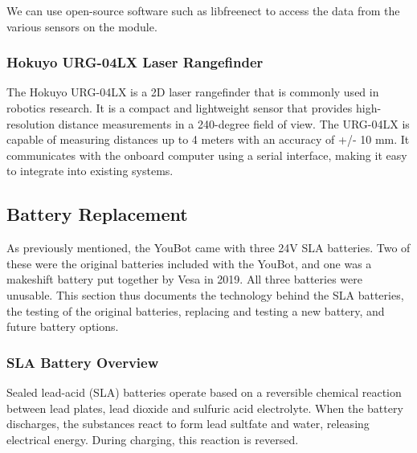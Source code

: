 \documentclass[a4paper, 12pt]{article}
\newif\ifshownotes
\newcommand{\notes}[1]{\ifshownotes\textcolor{blue}{#1}\fi}
\begin{document}
    We can use open-source software such as libfreenect to access the data from the various sensors on the module.


    \notes{discuss the libfreenect library, how to install it, and how it could be used within ROS.}


    \subsubsection{Hokuyo URG-04LX Laser Rangefinder}

    The Hokuyo URG-04LX is a 2D laser rangefinder that is commonly used in robotics research. It is a compact and lightweight sensor that provides high-resolution distance measurements in a 240-degree field of view. The URG-04LX is capable of measuring distances up to 4 meters with an accuracy of +/- 10 mm. It communicates with the onboard computer using a serial interface, making it easy to integrate into existing systems.

    \notes{discuss installing the drivers and whatnot, and how to use it within ROS and rqt.}

   
    \pagebreak

    \subsection{Battery Replacement}



    \notes{draft 1, 11.05 12pm\\
    Here are some good web pages about the Slealed Lead Acid (SLA) batteries:
https://batterymasters.co.uk/blog/post/How%
and
https://www.power-sonic.com/blog/how-to-charge-a-lead-acid-battery/
and
https://www.powerstream.com/SLA.htm}

    As previously mentioned, the YouBot came with three 24V SLA batteries. Two of these were the original batteries included with the YouBot, and one was a makeshift battery put together by Vesa in 2019. All three batteries were unusable. This section thus documents the technology behind the SLA batteries, the testing of the original batteries, replacing and testing a new battery, and future battery options. 

    \subsubsection{SLA Battery Overview}

    Sealed lead-acid (SLA) batteries operate based on a reversible chemical reaction between lead plates, lead dioxide and sulfuric acid electrolyte. When the battery discharges, the substances react to form lead sultfate and water, releasing electrical energy. During charging, this reaction is reversed.
\end{document}
